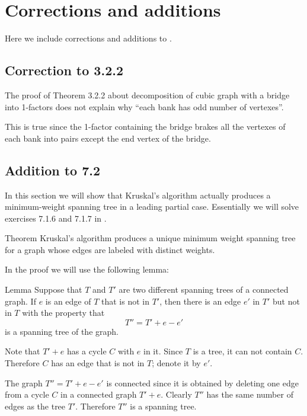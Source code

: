 \chapter{Corrections and additions}

Here we include corrections and additions to \cite{pearls}.

\section*{Correction to 3.2.2}

The proof of Theorem 3.2.2 about decomposition of cubic graph with a bridge into 1-factors
does not explain why ``each bank has odd number of vertexes''.

This is true since the 1-factor containing the bridge brakes all the vertexes of each bank into pairs except the end vertex of the bridge.



\section*{Addition to 7.2}

In this section we will show that Kruskal’s algorithm actually produces a minimum-weight spanning tree in a leading partial case.
Essentially we will solve exercises 7.1.6 and 7.1.7 in \cite{pearls}. 

\begin{thm}{Theorem}
Kruskal’s algorithm produces a unique minimum weight spanning tree for a graph whose edges are labeled with
distinct weights. 

\end{thm}

In the proof we will use the following lemma:

\begin{thm}{Lemma}\label{lem:T+e-e}
Suppose that $T$ and $T'$ are two different spanning trees of a connected
graph. 
If $e$ is an edge of $T$ that is not in $T'$, then there is an edge $e'$
in $T'$ but not in $T$ with the property that 
\[T''=T' + e - e'\]
is a spanning tree of the
graph.
\end{thm}

Note that $T' + e$ has a cycle $C$ with $e$ in it.
Since $T$ is a tree, it can not contain $C$.
Therefore $C$ has an edge that is not in $T$;
denote it by $e'$.

The graph $T''=T' + e-e'$ is connected since it is obtained by deleting one edge from a cycle $C$ in a connected graph $T' + e$.
Clearly $T''$ has the same number of edges as the tree $T'$.
Therefore $T''$ is a spanning tree.
\qeds

